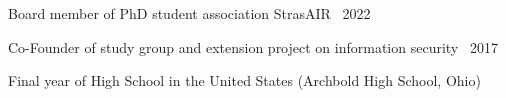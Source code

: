 

Board member of PhD student association StrasAIR \dotfill {} \textemdash\ 2022


Co-Founder of study group and extension project on information security \dotfill {} \textemdash\ 2017


Final year of High School in the United States (Archbold High School, Ohio)	\dotfill {}
